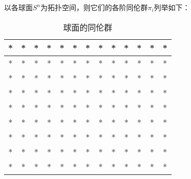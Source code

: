 

以各球面$S^n$为拓扑空间，则它们的各阶同伦群$\pi_i$列举如下：

\begin{table}[ht]
\centering
\caption{球面的同伦群}\label{SphHmt_tab1}
\begin{tabular}{|c|c|c|c|c|c|c|c|c|c|c|c|c|}
\hline
* & * & * & * & * & * & * & * & * & * & * & * & * \\
\hline
* & * & * & * & * & * & * & * & * & * & * & * & * \\
\hline
* & * & * & * & * & * & * & * & * & * & * & * & * \\
\hline
* & * & * & * & * & * & * & * & * & * & * & * & * \\
\hline
* & * & * & * & * & * & * & * & * & * & * & * & * \\
\hline
* & * & * & * & * & * & * & * & * & * & * & * & * \\
\hline
* & * & * & * & * & * & * & * & * & * & * & * & * \\
\hline
* & * & * & * & * & * & * & * & * & * & * & * & * \\
\hline
* & * & * & * & * & * & * & * & * & * & * & * & * \\
\hline
\end{tabular}
\end{table}
